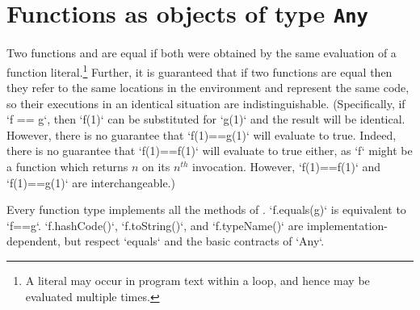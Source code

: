 \section{Functions as objects of type {\tt Any}}
\label{FunctionAnyMethods}

\label{FunctionEquality}
  Two functions  and
 are equal if both were obtained by the same evaluation of a function
literal.\footnote{A literal may occur in program text within a loop, and hence
  may be evaluated multiple times.} Further, it is guaranteed that if two
functions are equal then they refer to the same locations in the environment
and represent the same code, so their executions in an identical situation are
indistinguishable. (Specifically, if \xcd`f == g`, then \xcd`f(1)` can be
substituted for \xcd`g(1)` and the result will be identical. However, there is
no guarantee that \xcd`f(1)==g(1)` will evaluate to true. Indeed, there is no
guarantee that \xcd`f(1)==f(1)` will evaluate to true either, as \xcd`f` might
be a function which returns {$n$} on its {$n^{th}$} invocation. However,
\xcd`f(1)==f(1)` and \xcd`f(1)==g(1)` are interchangeable.)


Every function type implements all the methods of .
\xcd`f.equals(g)` is equivalent to \xcd`f==g`.  \xcd`f.hashCode()`, 
\xcd`f.toString()`, and \xcd`f.typeName()` are implementation-dependent, but
respect \xcd`equals` and the basic contracts of \xcd`Any`. 



